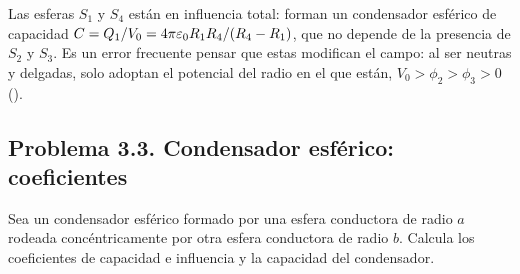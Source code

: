 

\begin{observacion}[Interpretación]\label{obs:sem-cuatro}
Las esferas $S_1$ y $S_4$ están en influencia total: forman un condensador esférico de capacidad $C=Q_1/V_0=4\pi\varepsilon_{0} R_1R_4/(R_4-R_1)$, que no depende de
la presencia de $S_2$ y $S_3$. Es un error frecuente pensar que estas modifican el campo: al ser neutras y delgadas, solo adoptan el potencial del radio en el que
están, $V_0>\phi_2>\phi_3>0$ ().
\end{observacion}

\subsection{Problema 3.3. Condensador esférico: coeficientes}\label{sem:esferico}
\begin{problema}\label{prob:esferico}
Sea un condensador esférico formado por una esfera conductora de radio $a$ rodeada concéntricamente por otra esfera conductora de radio $b$. Calcula los
coeficientes de capacidad e influencia y la capacidad del condensador.
\end{problema}

